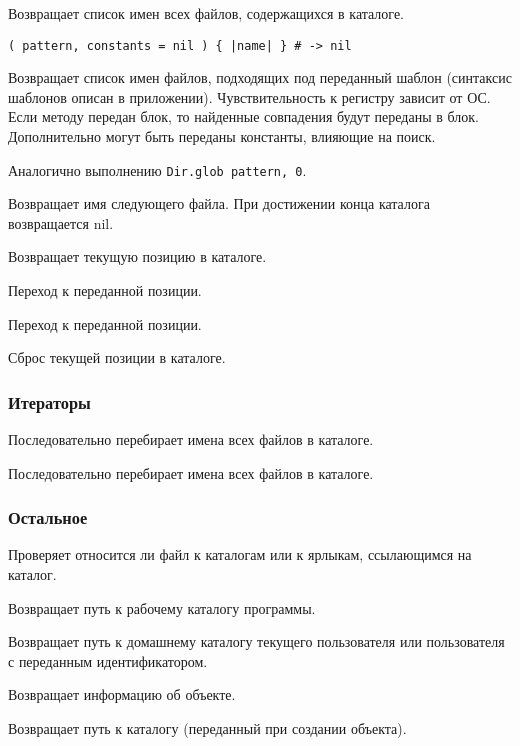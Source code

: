 \begin{methodlist}
  Возвращает список имен всех файлов, содержащихся в каталоге.

  \verb!( pattern, constants = nil ) { |name| } # -> nil!

  Возвращает список имен файлов, подходящих под переданный шаблон (синтаксис шаблонов описан в приложении). Чувствительность к регистру зависит от ОС. Если методу передан блок, то найденные совпадения будут переданы в блок. Дополнительно могут быть переданы константы, влияющие на поиск.

  Аналогично выполнению \verb!Dir.glob pattern, 0!. 

  Возвращает имя следующего файла. При достижении конца каталога возвращается nil. 
 
  Возвращает текущую позицию в каталоге. 

  Переход к переданной позиции. 
 
  Переход к переданной позиции.

  Сброс текущей позиции в каталоге.
\end{methodlist}

\subsubsection*{Итераторы}

\begin{methodlist}
  Последовательно перебирает имена всех файлов в каталоге. 

  Последовательно перебирает имена всех файлов в каталоге. 
\end{methodlist}

\subsubsection*{Остальное}

\begin{methodlist}
  Проверяет относится ли файл к каталогам или к ярлыкам, ссылающимся на каталог.

  Возвращает путь к рабочему каталогу программы. 
 
  Возвращает путь к домашнему каталогу текущего пользователя или пользователя с переданным идентификатором. 

  Возвращает информацию об объекте. 
 
  Возвращает путь к каталогу (переданный при создании объекта).
\end{methodlist}
    
